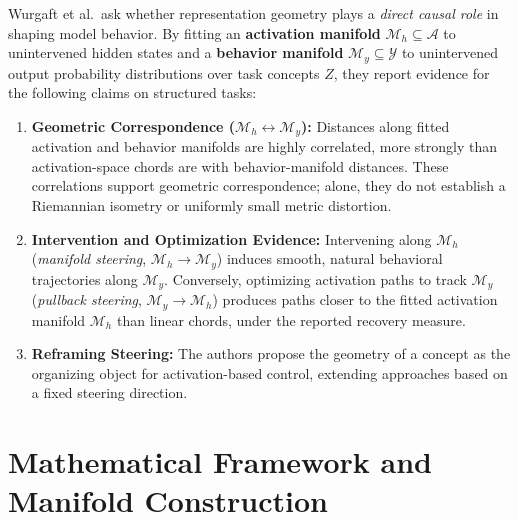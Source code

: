 \documentclass[10pt,a4paper]{article}
\newcommand{\Mh}{\mathcal{M}_h}
\newcommand{\My}{\mathcal{M}_y}
\begin{document}
Wurgaft et al.\ ask whether representation geometry plays a \emph{direct causal role} in shaping model behavior. By fitting an \textbf{activation manifold} $\Mh \subseteq \mathcal{A}$ to unintervened hidden states and a \textbf{behavior manifold} $\My \subseteq \mathcal{Y}$ to unintervened output probability distributions over task concepts $Z$, they report evidence for the following claims on structured tasks:
\begin{enumerate}[leftmargin=*,nosep]
    \item \textbf{Geometric Correspondence ($\Mh \leftrightarrow \My$):} Distances along fitted activation and behavior manifolds are highly correlated, more strongly than activation-space chords are with behavior-manifold distances. These correlations support geometric correspondence; alone, they do not establish a Riemannian isometry or uniformly small metric distortion.
    \item \textbf{Intervention and Optimization Evidence:} Intervening along $\Mh$ (\emph{manifold steering}, $\Mh \to \My$) induces smooth, natural behavioral trajectories along $\My$. Conversely, optimizing activation paths to track $\My$ (\emph{pullback steering}, $\My \to \Mh$) produces paths closer to the fitted activation manifold $\Mh$ than linear chords, under the reported recovery measure.
    \item \textbf{Reframing Steering:} The authors propose the geometry of a concept as the organizing object for activation-based control, extending approaches based on a fixed steering direction.
\end{enumerate}

\section{Mathematical Framework and Manifold Construction}
\end{document}
